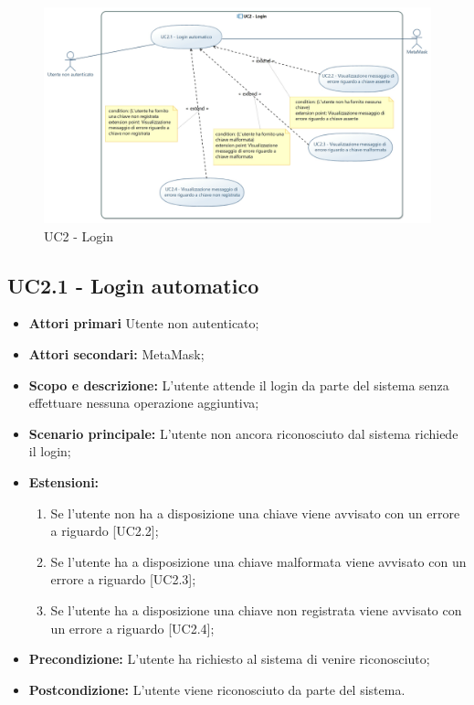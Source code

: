 \documentclass[AnalisiDeiRequisiti.tex]{subfiles}
\begin{document}
\begin{figure}[h]
	\centering
	\includegraphics[width=1.0\linewidth]{UC2.jpg}
	\caption{UC2 - Login}
	\label{fig:UC2 - Login}
\end{figure}

\subsection{UC2.1 - Login automatico}
\begin{itemize}
\item \textbf{Attori primari} Utente non autenticato;\\
\item \textbf{Attori secondari:} MetaMask;\\
\item \textbf{Scopo e descrizione:} L'utente attende il login da parte del sistema senza effettuare nessuna operazione aggiuntiva;\\
\item \textbf{Scenario principale:} L'utente non ancora riconosciuto dal sistema richiede il login;\\
\item \textbf{Estensioni:}\\
\begin{enumerate}
	\item Se l'utente non ha a disposizione una chiave viene avvisato con un errore a riguardo [UC2.2];
	\item Se l'utente ha a disposizione una chiave malformata viene avvisato con un errore a riguardo [UC2.3];
	\item Se l'utente ha a disposizione una chiave non registrata viene avvisato con un errore a riguardo [UC2.4];
\end{enumerate}
\item \textbf{Precondizione:} L'utente ha richiesto al sistema di venire riconosciuto;\\
\item \textbf{Postcondizione:} L'utente viene riconosciuto da parte del sistema.\\
\end{itemize}
\end{document}
